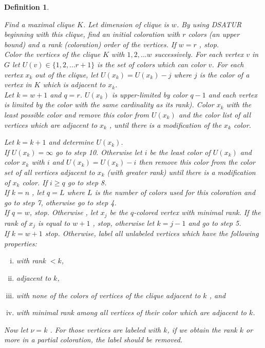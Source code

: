 \documentclass[12pt]{article}
\theoremstyle{slplain}
\newtheorem{defi}{Definition}
\begin{document}
\begin{defi}
\begin{algorithm}[H]
{\small  Find a maximal clique $K$. Let dimension of clique is $w$. By using DSATUR
beginning with this clique, find an initial coloration with $r$ colors (an
upper bound) and a rank (coloration) order of the vertices. If $w = r$ , stop.\\

 Color the vertices of the clique $K$ with $1, 2, . . . w$ successively. For each
vertex $v$ in $G$ let $U(v) \in \{1, 2, . . . r + 1\}$ is the set of colors which can color
$v$. For each vertex $x_k$ out of the clique, let $U(x_k) = U(x_k) - j$ where $j$ is
the color of a vertex in $K$ which is adjacent to $x_k$.\\

 Let $k = w + 1$ and $q = r$.\newline
$U(x_k)$ is upper-limited by color $q - 1$ and each vertex is limited by the color
with the same cardinality as its rank). Color $x_k$ with the least possible
color and remove this color from $U(x_k)$ and the color list of all vertices
which are adjacent to $x_k$ , until there is a modification of the $x_k$ color.

 Let $k = k + 1$ and determine $U(x_k)$.\\

 If $U(x_k) = \infty$ go to step 10. Otherwise let $i$ be the least color of $U(x_k)$ and
color $x_k$ with $i$ and $U(x_k) = U(x_k) - i$ then remove this color from the
color set of all vertices adjacent to $x_k$ (with greater rank) until there is a
modification of $x_k$ color. If $i \geq q$ go to step 8.\\

 If $k = n$ , let $q = L$ where $L$ is the number of colors used for this coloration
and go to step 7, otherwise go to step 4.\\

 If $q = w$, stop. Otherwise , let $x_j$ be the $q$-colored vertex with minimal
rank. If the rank of $x_j$ is equal to $w + 1$ , stop, otherwise let $k = j - 1$ and
go to step 5.\\

 If $k = w + 1$ stop. Otherwise, label all unlabeled vertices which have the
following properties:
\begin{enumerate}[(i)]
\item with rank $< k$,

\item adjacent to $k$,

\item with none of the colors of vertices of the clique adjacent to $k$ , and
\item with minimal rank among all vertices of their color which are adjacent
to $k$.
\end{enumerate}\newline
Now let $\nu = k$ . For those vertices are labeled with $k$, if we obtain the rank
$k$ or more in a partial coloration, the label should be removed.\\


}
\end{algorithm}
\end{defi}
\end{document}
